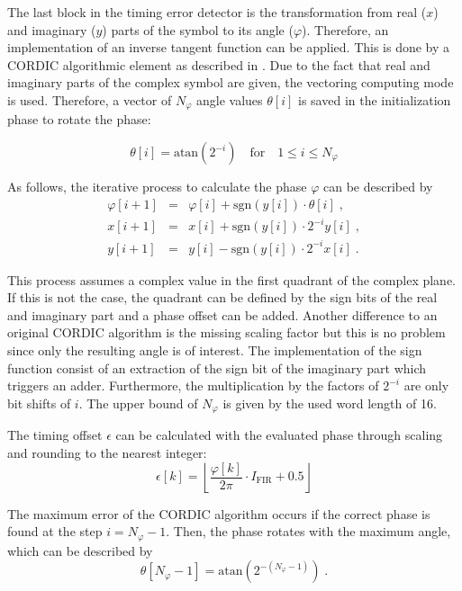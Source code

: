 The last block in the timing error detector is the transformation from real ($x$) and imaginary ($y$) parts of the symbol to its angle ($\varphi$). Therefore, an implementation of an inverse tangent function can be applied. This is done by a \ac{CORDIC} algorithmic element as described in \cite{cordic}. Due to the fact that real and imaginary parts of the complex symbol are given, the vectoring computing mode is used. Therefore, a vector of $N_{\varphi}$ angle values $\theta[i]$ is saved in the initialization phase to rotate the phase:

\begin{equation}
\theta[i] = \text{atan} \left(2^{-i}\right) \quad \text{for} \quad 1 \leq i \leq N_{\varphi}
\end{equation}

As follows, the iterative process to calculate the phase $\varphi$ can be described by
\begin{eqnarray}
\varphi[i+1]	&=& \varphi[i] + \text{sgn} \left(y[i] \right) \cdot \theta[i]\;, \\ 
x[i+1]				&=& x[i] + \text{sgn} \left(y[i] \right) \cdot 2^{-i}y[i]\;, \\ 
y[i+1]				&=& y[i] - \text{sgn} \left(y[i] \right) \cdot 2^{-i}x[i]\;.
\end{eqnarray}

This process assumes a complex value in the first quadrant of the complex plane. If this is not the case, the quadrant can be defined by the sign bits of the real and imaginary part and a phase offset can be added. Another difference to an original CORDIC algorithm is the missing scaling factor but this is no problem since only the resulting angle is of interest. The implementation of the sign function consist of an extraction of the sign bit of the imaginary part which triggers an adder. Furthermore, the multiplication by the factors of $2^{-i}$ are only bit shifts of $i$. The upper bound of $N_{\varphi}$ is given by the used word length of 16.

The timing offset $\epsilon$ can be calculated with the evaluated phase through scaling and rounding to the nearest integer:
\begin{equation}
\epsilon[k] =\left\lfloor  \frac{\varphi[k]}{2\pi} \cdot I_\text{FIR} + 0.5 \right\rfloor
\end{equation}

The maximum error of the CORDIC algorithm occurs if the correct phase is found at the step $i=N_{\varphi}-1$. Then, the phase rotates with the maximum angle, which can be described by
\begin{equation}
\theta[N_\varphi-1] = \text{atan}\left(2^{-\left(N_\varphi-1\right)} \right)\;.
\end{equation}

